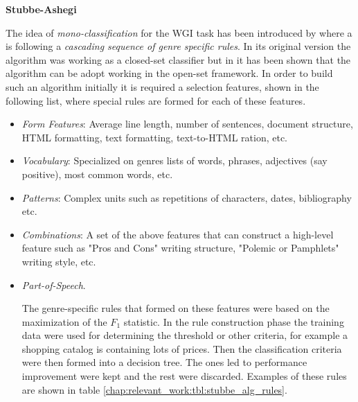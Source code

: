 \textbf{Stubbe-Ashegi}

The idea of \textit{mono-classification} for the WGI task has been introduced by \parencite{stubbe2007genre} where a  is following a \textit{cascading sequence of genre specific rules}. In its original version the algorithm was working as a closed-set classifier but in \parencite{Asheghi2015} it has been shown that the algorithm can be adopt working in the open-set framework. In order to build such an algorithm initially it is required a selection features, shown in the following list, where special rules are formed for each of these features.

\begin{itemize}
	\item \textit{Form Features}: Average line length, number of sentences, document structure, HTML formatting, text formatting, text-to-HTML ration, etc.
	\item \textit{Vocabulary}: Specialized on genres lists of words, phrases, adjectives (say positive), most common words, etc.
	\item \textit{Patterns}: Complex units such as repetitions of characters, dates, bibliography etc.
	\item \textit{Combinations}: A set of the above features that can construct a high-level feature such as "Pros and Cons" writing structure, "Polemic or Pamphlets" writing style, etc.
	\item \textit{Part-of-Speech}.
\begin{end}

The genre-specific rules that formed on these features were based on the maximization of the $F_{1}$ statistic. In the rule construction phase the training data were used for determining the threshold or other criteria, for example a shopping catalog is containing lots of prices. Then the classification criteria were then formed into a decision tree. The ones led to performance improvement were kept and the rest were discarded. Examples of these rules are shown in table \ref{chap:relevant_work:tbl:stubbe_alg_rules}.


\end{end}
\end{itemize}
